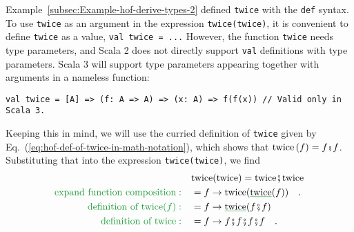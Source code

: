 Example~\ref{subsec:Example-hof-derive-types-2} defined \lstinline!twice!
with the \lstinline!def! syntax. To use \lstinline!twice! as an
argument in the expression \lstinline!twice(twice)!, it is convenient
to define \lstinline!twice! as a value, \lstinline!val twice = ...!
However, the function \lstinline!twice! needs type parameters, and
Scala 2 does not directly support \lstinline!val! definitions with
type parameters. Scala 3 will support type parameters appearing together
with arguments in a nameless function:
\begin{lstlisting}
val twice = [A] => (f: A => A) => (x: A) => f(f(x)) // Valid only in Scala 3.
\end{lstlisting}
Keeping this in mind, we will use the curried definition of \lstinline!twice!
given by Eq.~(\ref{eq:hof-def-of-twice-in-math-notation}), which
shows that $\text{twice}\left(f\right)=f\bef f$. Substituting that
into the expression \lstinline!twice(twice)!, we find
\begin{align*}
 & \text{twice}(\text{twice})=\text{twice}\bef\text{twice}\\
{\color{greenunder}\text{expand function composition}:}\quad & =f\Rightarrow\text{twice}(\gunderline{\text{twice}}(f))\quad.\\
{\color{greenunder}\text{definition of }\text{twice}(f):}\quad & =f\Rightarrow\gunderline{\text{twice}}(f\bef f)\\
{\color{greenunder}\text{definition of twice}:}\quad & =f\Rightarrow f\bef f\bef f\bef f\quad.
\end{align*}
\begin{comment}
The last expression is hard to use: it is confusing that the argument
names $f$ and $x$ are repeated. The calculation will be made clearer
if we rename the arguments to remove shadowing of names. To avoid
errors, we will start with $x\Rightarrow\text{twice}(\text{twice}(x))$
and rename arguments one scope at a time:
\begin{align*}
 & x\Rightarrow\text{twice}(\text{twice}(\gunderline x))\\
{\color{greenunder}\text{rename }x\text{ to }z:}\quad & =z\Rightarrow\gunderline{\text{twice}}(\text{twice}(z))\\
{\color{greenunder}\text{definition of twice}:}\quad & =z\Rightarrow\gunderline{\left(f\Rightarrow x\Rightarrow f(f(x))\right)}\left(\text{twice}(z)\right)\\
{\color{greenunder}\text{rename }f,x\text{ to }g,y:}\quad & =z\Rightarrow(g\Rightarrow y\Rightarrow\gunderline g(\gunderline g(y)))\left(\text{twice}(z)\right)\\
{\color{greenunder}\text{substitute }g=\text{twice}(z):}\quad & =z\Rightarrow y\Rightarrow\gunderline{\left(\text{twice}(z)\right)}\left(\text{twice}(z)(y)\right)\\
{\color{greenunder}\text{use }\text{twice}(z)=\left(x\Rightarrow z(z(x))\right):}\quad & =z\Rightarrow y\Rightarrow\left(x\Rightarrow z(z(x))\right)(\gunderline{\text{twice}(z)(y)})\\
{\color{greenunder}\text{substitute }x=\text{twice}(z)(y)=z(z(y)):}\quad & =z\Rightarrow y\Rightarrow z(z(z(z(y))))\quad.
\end{align*}
\end{comment}
